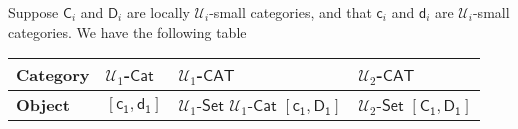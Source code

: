 Suppose $\mathsf{C}_i$ and $\mathsf{D}_i$ are locally $\mathscr{U}_i$-small categories, and that $\mathsf{c}_i$ and $\mathsf{d}_i$ are $\mathscr{U}_i$-small categories. We have the following table
\begin{table}[h]
    \centering
    \begin{tabular}{P{2cm}|P{2cm}|P{2cm}|P{2cm}}
        \toprule
        \textbf{Category}&$\mathscr{U}_1$-$\mathsf{Cat}$ & $\mathscr{U}_1$-$\mathsf{CAT}$ & $\mathscr{U}_2$-$\mathsf{CAT}$ \\
        \midrule
        \midrule
        \textbf{Object}&$ [\mathsf{c_1},\mathsf{d_1}]$& $\mathscr{U}_1$-$\mathsf{Set}$ $\mathscr{U}_1$-$\mathsf{Cat}$ $[\mathsf{c_1},\mathsf{D_1}]$& $\mathscr{U}_2$-$\mathsf{Set}$ $[\mathsf{C_1},\mathsf{D_1}]$ \\ \bottomrule
    \end{tabular}
\end{table}

